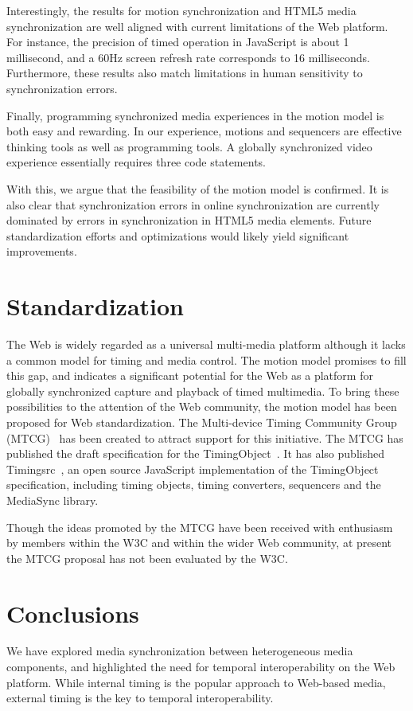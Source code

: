\documentclass[graybox]{svmult}
\begin{document}
Interestingly, the results for motion synchronization and HTML5 media
synchronization are well aligned with current limitations of the Web platform.
For instance, the precision of timed operation in JavaScript is about 1
millisecond, and a 60Hz screen refresh rate corresponds to 16 milliseconds.
Furthermore, these results also match limitations in human sensitivity to
synchronization errors. 

Finally, programming synchronized media experiences in the motion model is
both easy and rewarding. In our experience, motions and sequencers are
effective thinking tools as well as programming tools. A globally synchronized
video experience essentially requires three code statements.

With this, we argue that the feasibility of the motion model is confirmed. It
is also clear that synchronization errors in online synchronization are
currently dominated by errors in synchronization in HTML5 media elements.
Future standardization efforts and optimizations would likely yield
significant improvements.

\section{Standardization}
\label{sec:standard}
The Web is widely regarded as a universal multi-media platform although it
lacks a common model for timing and media control. The motion model promises
to fill this gap, and indicates a significant potential for the Web as a
platform for globally synchronized capture and playback of timed multimedia.
To bring these possibilities to the attention of the Web community, the motion
model has been proposed for Web standardization. The Multi-device Timing
Community Group (MTCG)~\cite{mtcg} has been created to attract support for
this initiative. The MTCG has published the draft specification for the
TimingObject~\cite{timingobject}. It has also published
Timingsrc~\cite{timingsrc}, an open source JavaScript implementation of the
TimingObject specification, including timing objects, timing converters,
sequencers and the MediaSync library.

Though the ideas promoted by the MTCG have been received with enthusiasm by
members within the W3C and within the wider Web community, at present the MTCG
proposal has not been evaluated by the W3C.

\section{Conclusions}
\label{sec:concl}
We have explored media synchronization between heterogeneous media components,
and highlighted the need for temporal interoperability on the Web platform.
While internal timing is the popular approach to Web-based media, external
timing is the key to temporal interoperability.
\end{document}
